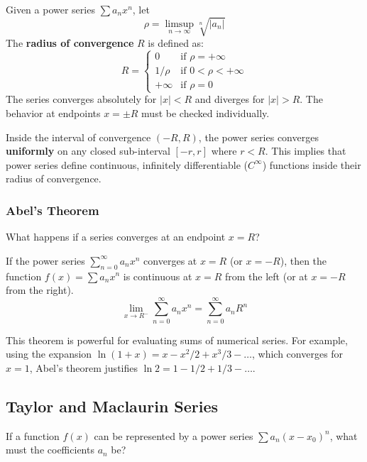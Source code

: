 \documentclass[oneside]{book}
\begin{document}
\begin{theorem}
Given a power series $\sum a_n x^n$, let
\[ \rho = \limsup_{n \to \infty} \sqrt[n]{|a_n|} \]
The \textbf{radius of convergence} $R$ is defined as:
\[ R = \begin{cases} 0 & \text{if } \rho = +\infty \\ 1/\rho & \text{if } 0 < \rho < +\infty \\ +\infty & \text{if } \rho = 0 \end{cases} \]
The series converges absolutely for $|x| < R$ and diverges for $|x| > R$. The behavior at endpoints $x = \pm R$ must be checked individually.
\end{theorem}

\begin{property}
Inside the interval of convergence $(-R, R)$, the power series converges \textbf{uniformly} on any closed sub-interval $[-r, r]$ where $r < R$.
This implies that power series define continuous, infinitely differentiable ($C^\infty$) functions inside their radius of convergence.
\end{property}

\subsubsection{Abel's Theorem}
What happens if a series converges at an endpoint $x=R$?

\begin{theorem}
If the power series $\sum_{n=0}^{\infty} a_n x^n$ converges at $x = R$ (or $x = -R$), then the function $f(x) = \sum a_n x^n$ is continuous at $x = R$ from the left (or at $x = -R$ from the right).
\[ \lim_{x \to R^-} \sum_{n=0}^{\infty} a_n x^n = \sum_{n=0}^{\infty} a_n R^n \]
\end{theorem}

This theorem is powerful for evaluating sums of numerical series. For example, using the expansion $\ln(1+x) = x - x^2/2 + x^3/3 - \dots$, which converges for $x=1$, Abel's theorem justifies $\ln 2 = 1 - 1/2 + 1/3 - \dots$.

\subsection{Taylor and Maclaurin Series}

If a function $f(x)$ can be represented by a power series $\sum a_n (x-x_0)^n$, what must the coefficients $a_n$ be?
\end{document}
